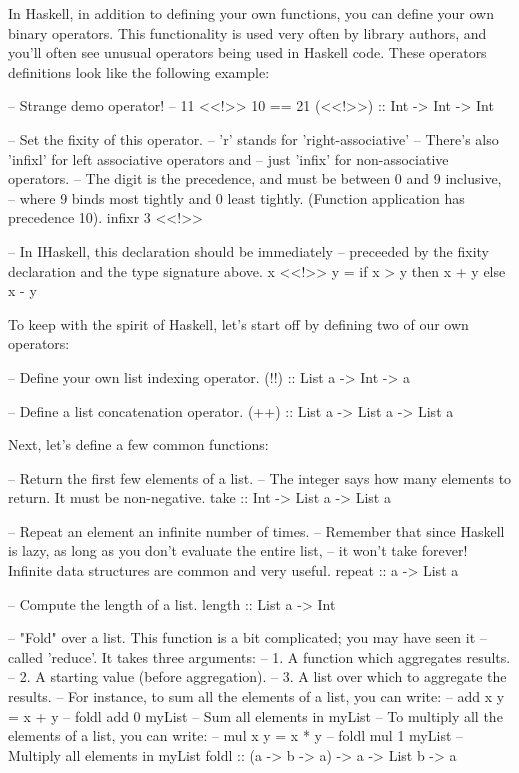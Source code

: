 \documentclass{article}
\begin{document}
In Haskell, in addition to defining your own functions, you can define your own binary operators.
This functionality is used very often by library authors, and you'll often see unusual operators
being used in Haskell code.  These operators definitions look like the following example:
\begin{haskellcode}
-- Strange demo operator!
-- 11 <<!>> 10 == 21
(<<!>>) :: Int -> Int -> Int

-- Set the fixity of this operator.
-- 'r' stands for 'right-associative'
-- There's also 'infixl' for left associative operators and 
-- just 'infix' for non-associative operators. 
-- The digit is the precedence, and must be between 0 and 9 inclusive,
-- where 9 binds most tightly and 0 least tightly. (Function application has precedence 10).
infixr 3 <<!>>

-- In IHaskell, this declaration should be immediately 
-- preceeded by the fixity declaration and the type signature above.
x <<!>> y = 
  if x > y
  then x + y
  else x - y
\end{haskellcode}

To keep with the spirit of Haskell, let's start off by defining two
of our own operators:

\begin{haskellcode}
-- Define your own list indexing operator.
(!!) :: List a -> Int -> a

-- Define a list concatenation operator.
(++) :: List a -> List a -> List a
\end{haskellcode}

\newpage Next, let's define a few common functions:

\begin{haskellcode}
-- Return the first few elements of a list.
-- The integer says how many elements to return. It must be non-negative.
take :: Int -> List a -> List a

-- Repeat an element an infinite number of times.
-- Remember that since Haskell is lazy, as long as you don't evaluate the entire list,
-- it won't take forever! Infinite data structures are common and very useful.
repeat :: a -> List a

-- Compute the length of a list.
length :: List a -> Int

-- "Fold" over a list. This function is a bit complicated; you may have seen it
-- called 'reduce'. It takes three arguments:
--   1. A function which aggregates results.
--   2. A starting value (before aggregation).
--   3. A list over which to aggregate the results.
-- For instance, to sum all the elements of a list, you can write:
--     add x y = x + y
--     foldl add 0 myList -- Sum all elements in myList
-- To multiply all the elements of a list, you can write:
--     mul x y = x * y
--     foldl mul 1 myList -- Multiply all elements in myList
foldl :: (a -> b -> a) -> a -> List b -> a
\end{haskellcode}
\end{document}
